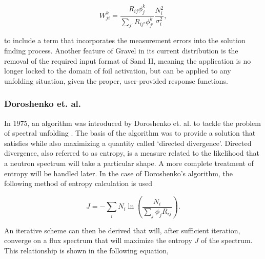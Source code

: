 \begin{equation}
\label{eqn:gravel-w}
W_{ji}^k = \frac{R_{ij} \phi_{j}^k}{\sum_{j'} R_{ij'} \phi_{j'}^k} \frac{N_i^2}{\sigma_i^2} ,
\end{equation}

\noindent
to include a term that incorporates the measurement errors into the solution finding process.
Another feature of Gravel in its current distribution is the removal of the required input format of Sand II, meaning the application is no longer locked to the domain of foil activation, but can be applied to any unfolding situation, given the proper, user-provided response functions.



\subsubsection{Doroshenko et. al.}

In 1975, an algorithm was introduced by Doroshenko et. al. to tackle the problem of spectral unfolding \cite{doroshenko1977new}.
The basis of the algorithm was to provide a solution that satisfies  while also maximizing a quantity called `directed divergence'.
Directed divergence, also referred to as entropy, is a measure related to the likelihood that a neutron spectrum will take a particular shape.
A more complete treatment of entropy will be handled later.
In the case of Doroshenko's algorithm, the following method of entropy calculation is used

\begin{equation}
\label{eqn:doroshenko-entropy}
J = - \sum_i N_i \ln(\frac{N_i}{\sum_j \phi_j R_{ij}}) .
\end{equation}

An iterative scheme can then be derived that will, after sufficient iteration, converge on a flux spectrum that will maximize the entropy $J$ of the spectrum.
This relationship is shown in the following equation,


